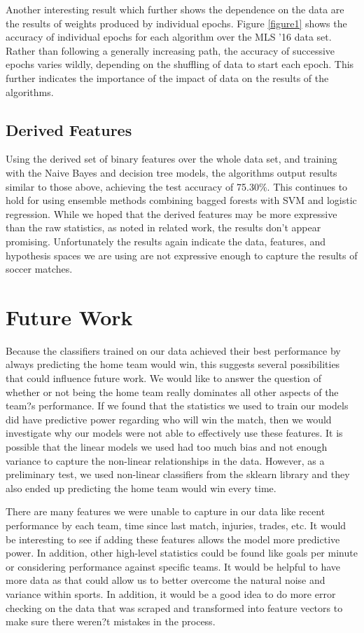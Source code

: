 Another interesting result which further shows the dependence on the data are the results of weights produced by individual epochs. Figure \ref{figure1} shows the accuracy of individual epochs for each algorithm over the MLS '16 data set. Rather than following a generally increasing path, the accuracy of successive epochs varies wildly, depending on the shuffling of data to start each epoch. This further indicates the importance of the impact of data on the results of the algorithms. 

\subsection{Derived Features}
Using the derived set of binary features over the whole data set, and training with the Naive Bayes and decision tree models, the algorithms output results similar to those above, achieving the test accuracy of 75.30\%. This continues to hold for using ensemble methods combining bagged forests with SVM and logistic regression. While we hoped that the derived features may be more expressive than the raw statistics, as noted in related work, the results don't appear promising. Unfortunately the results again indicate the data, features, and hypothesis spaces we are using are not expressive enough to capture the results of soccer matches.

\section{Future Work}
Because the classifiers trained on our data achieved their best performance by always predicting the home team would win, this suggests several possibilities that could influence future work. We would like to answer the question of whether or not being the home team really dominates all other aspects of the team?s performance. If we found that the statistics we used to train our models did have predictive power regarding who will win the match, then we would investigate why our models were not able to effectively use these features. It is possible that the linear models we used had too much bias and not enough variance to capture the non-linear relationships in the data. However, as a preliminary test, we used non-linear classifiers from the sklearn library and they also ended up predicting the home team would win every time.

There are many features we were unable to capture in our data like recent performance by each team, time since last match, injuries, trades, etc. It would be interesting to see if adding these features allows the model more predictive power. In addition, other high-level statistics could be found like goals per minute or considering performance against specific teams. It would be helpful to have more data as that could allow us to better overcome the natural noise and variance within sports. In addition, it would be a good idea to do more error checking on the data that was scraped and transformed into feature vectors to make sure there weren?t mistakes in the process.

